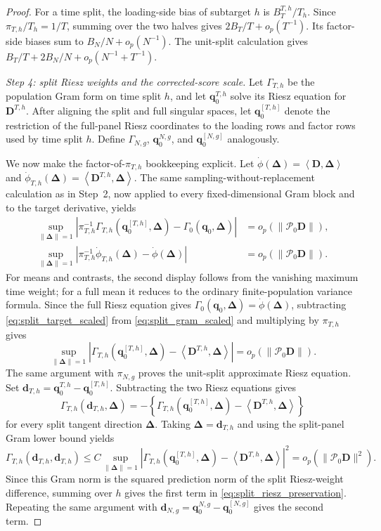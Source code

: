 \documentclass[11pt]{article}
\numberwithin{equation}{section}
\theoremstyle{remark}
\newcommand{\ip}[2]{\left\langle #1,#2\right\rangle}
\newcommand{\bq}{\bm q}
\newcommand{\bD}{\bm D}
\newcommand{\bDelta}{\bm\Delta}
\newcommand{\calP}{\mathcal P}
\begin{document}
\begin{proof}
For a time split, the loading-side bias of subtarget $h$ is $B_T^{T,h}/T_h$. Since $\pi_{T,h}/T_h=1/T$, summing over the two halves gives $2B_T/T+o_p(T^{-1})$. Its factor-side biases sum to $B_N/N+o_p(N^{-1})$. The unit-split calculation gives $B_T/T+2B_N/N+o_p(N^{-1}+T^{-1})$.

\emph{Step 4: split Riesz weights and the corrected-score scale.}
Let $\Gamma_{T,h}$ be the population Gram form on time split $h$, and let $\bq_0^{T,h}$ solve its Riesz equation for $\bD^{T,h}$. After aligning the split and full singular spaces, let $\bq_0^{[T,h]}$ denote the restriction of the full-panel Riesz coordinates to the loading rows and factor rows used by time split $h$. Define $\Gamma_{N,g}$, $\bq_0^{N,g}$, and $\bq_0^{[N,g]}$ analogously.

We now make the factor-of-$\pi_{T,h}$ bookkeeping explicit. Let $\dot\phi(\bDelta)=\ip{\bD}{\bDelta}$ and $\dot\phi_{T,h}(\bDelta)=\ip{\bD^{T,h}}{\bDelta}$. The same sampling-without-replacement calculation as in Step~2, now applied to every fixed-dimensional Gram block and to the target derivative, yields
\begin{align}
\sup_{\|\bDelta\|=1}
\left|
\pi_{T,h}^{-1}
\Gamma_{T,h}(\bq_0^{[T,h]},\bDelta)
-
\Gamma_0(\bq_0,\bDelta)
\right|
&=
o_p(\|\calP_0\bD\|),
\label{eq:split_gram_scaled}\\
\sup_{\|\bDelta\|=1}
\left|
\pi_{T,h}^{-1}
\dot\phi_{T,h}(\bDelta)
-
\dot\phi(\bDelta)
\right|
&=
o_p(\|\calP_0\bD\|).
\label{eq:split_target_scaled}
\end{align}
For means and contrasts, the second display follows from the vanishing maximum time weight; for a full mean it reduces to the ordinary finite-population variance formula. Since the full Riesz equation gives $\Gamma_0(\bq_0,\bDelta)=\dot\phi(\bDelta)$, subtracting \eqref{eq:split_target_scaled} from \eqref{eq:split_gram_scaled} and multiplying by $\pi_{T,h}$ gives
$$
\sup_{\|\bDelta\|=1}
\left|
\Gamma_{T,h}(\bq_0^{[T,h]},\bDelta)
-
\ip{\bD^{T,h}}{\bDelta}
\right|
=
o_p(\|\calP_0\bD\|).
$$
The same argument with $\pi_{N,g}$ proves the unit-split approximate Riesz equation. Set $\bm d_{T,h}=\bq_0^{T,h}-\bq_0^{[T,h]}$. Subtracting the two Riesz equations gives
$$
\Gamma_{T,h}(\bm d_{T,h},\bDelta)
=
-\left\{
\Gamma_{T,h}(\bq_0^{[T,h]},\bDelta)
-
\ip{\bD^{T,h}}{\bDelta}
\right\}
$$
for every split tangent direction $\bDelta$. Taking $\bDelta=\bm d_{T,h}$ and using the split-panel Gram lower bound yields
$$
\Gamma_{T,h}(\bm d_{T,h},\bm d_{T,h})
\le
C
\sup_{\|\bDelta\|=1}
\left|
\Gamma_{T,h}(\bq_0^{[T,h]},\bDelta)
-
\ip{\bD^{T,h}}{\bDelta}
\right|^2
=
o_p(\|\calP_0\bD\|^2).
$$
Since this Gram norm is the squared prediction norm of the split Riesz-weight difference, summing over $h$ gives the first term in \eqref{eq:split_riesz_preservation}. Repeating the same argument with $\bm d_{N,g}=\bq_0^{N,g}-\bq_0^{[N,g]}$ gives the second term.


\end{proof}
\end{document}
